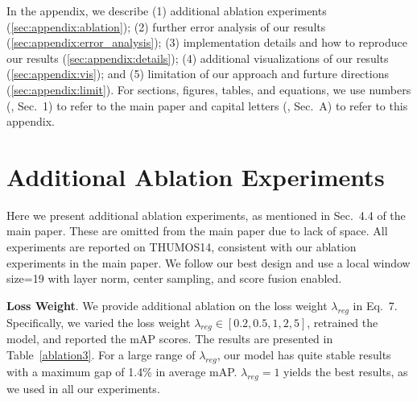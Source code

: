 \appendix

\setcounter{figure}{0}
\setcounter{table}{0}
\setcounter{section}{0}
\renewcommand{\theequation}{\Alph{equation}}
\renewcommand{\thefigure}{\Alph{figure}}
\renewcommand{\thesection}{\Alph{section}}
\renewcommand{\thetable}{\Alph{table}}

\renewcommand{\tableautorefname}{Table}
\renewcommand{\figureautorefname}{Fig.}
\renewcommand{\sectionautorefname}{Sec.}
\renewcommand{\subsectionautorefname}{Sec.}
\renewcommand{\equationautorefname}{Eq.}


In the appendix, we describe (1) additional ablation experiments (\autoref{sec:appendix:ablation}); (2) further error analysis of our results (\autoref{sec:appendix:error_analysis}); (3) implementation details and how to reproduce our results (\autoref{sec:appendix:details}); (4) additional visualizations of our results (\autoref{sec:appendix:vis}); and (5) limitation of our approach and furture directions (\autoref{sec:appendix:limit}). For sections, figures, tables, and equations, we use numbers (\eg, Sec.\ 1) to refer to the main paper and capital letters (\eg, Sec.\ A) to refer to this appendix. %

\section{Additional Ablation Experiments}\label{sec:appendix:ablation}
Here we present additional ablation experiments, as mentioned in Sec.\ 4.4 of the main paper. These are omitted from the main paper due to lack of space. All experiments are reported on THUMOS14, consistent with our ablation experiments in the main paper. We follow our best design and use a local window size=19 with layer norm, center sampling, and score fusion enabled.

\medskip
\noindent \textbf{Loss Weight}.
We provide additional ablation on the loss weight $\lambda_{reg}$ in Eq.\ 7. Specifically, we varied the loss weight $\lambda_{reg} \in [0.2, 0.5, 1, 2, 5]$, retrained the model, and reported the mAP scores. The results are presented in Table~\ref{ablation3}. For a large range of $\lambda_{reg}$, our model has quite stable results with a maximum gap of 1.4\% in average mAP. $\lambda_{reg}=1$ yields the best results, as we used in all our experiments. 

